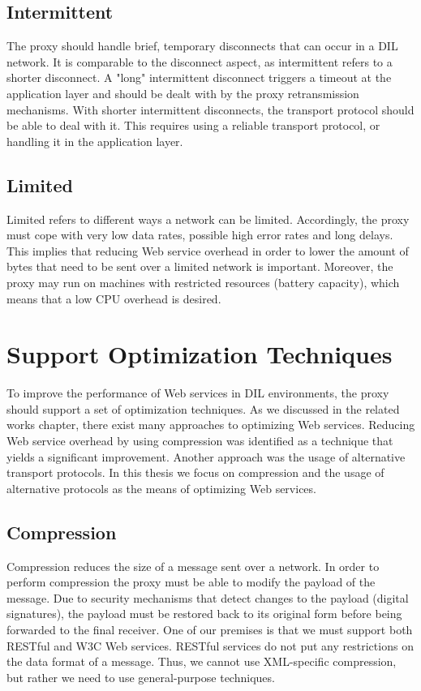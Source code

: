 \subsection{Intermittent}

The proxy should handle brief, temporary disconnects that can occur in a DIL
network. It is comparable to the disconnect aspect, as intermittent refers to a
shorter disconnect. A "long" intermittent disconnect triggers a timeout at the
application layer and should be dealt with by the proxy retransmission
mechanisms. With shorter intermittent disconnects, the transport protocol should
be able to deal with it. This requires using a reliable transport protocol, or
handling it in the application layer.

\subsection{Limited}

Limited refers to different ways a network can be limited. Accordingly, the
proxy must cope with very low data rates, possible high error rates and long
delays. This implies that reducing Web service overhead in order to lower the
amount of bytes that need to be sent over a limited network is important.
Moreover, the proxy may run on machines with restricted resources (battery
capacity), which means that a low CPU overhead is desired.

\section{Support Optimization Techniques}

To improve the performance of Web services in DIL environments, the proxy should
support a set of optimization techniques. As we discussed in the related works
chapter, there exist many approaches to optimizing Web services. Reducing Web
service overhead by using compression was identified as a technique that yields
a significant improvement. Another approach was the usage of alternative
transport protocols. In this thesis we focus on compression and the usage of
alternative protocols as the means of optimizing Web services.

\subsection{Compression}

Compression reduces the size of a message sent over a network. In order to
perform compression the proxy must be able to modify the payload of the message.
Due to security mechanisms that detect changes to the payload (digital
signatures), the payload must be restored back to its original form before being
forwarded to the final receiver. One of our premises is that we must support
both RESTful and W3C Web services. RESTful services do not put any restrictions
on the data format of a message. Thus, we cannot use XML-specific compression,
but rather we need to use general-purpose techniques.

